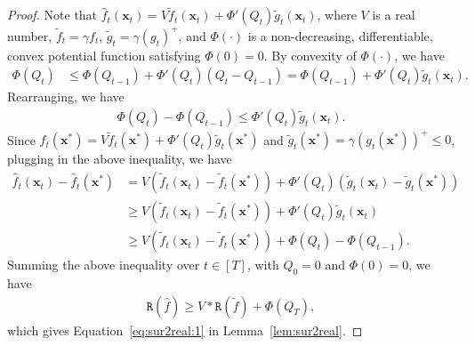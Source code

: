 \documentclass[twoside,11pt,]{article}
\newcommand{\BF}[1]{\mathbf{#1}}
\newcommand{\x}{\BF{x}}
\newcommand{\xt}{\x_t}
\newcommand{\xs}{\x^*}
\newcommand{\tf}{\tilde{f}}
\newcommand{\tft}{\tilde{f}_t}
\newcommand{\tgt}{\tilde{g}_t}
\newcommand{\hf}{\hat{f}}
\newcommand{\hft}{\hat{f}_t}
\newcommand{\qt}{Q_t}
\newcommand{\qtt}{Q_{t-1}}
\begin{document}
\begin{proof}
    Note that $\hft(\xt)=V\tft(\xt)+\Phi'(\qt)\tgt(\x_t)$, where $V$ is a real number, $\tft=\gamma f_t$, $\tgt=\gamma (g_t)^+$, and $\Phi(\cdot)$ is a non-decreasing, differentiable, convex potential function satisfying $\Phi(0)=0$. By convexity of $\Phi(\cdot)$, we have
    \begin{align*}
    \Phi(\qt) 
    &\leq \Phi(\qtt) + \Phi'(\qt)(\qt-\qtt) 
    = \Phi(\qtt) + \Phi'(\qt)\tgt(\xt).
    \end{align*}
    Rearranging, we have
    \begin{align*}
        \Phi(\qt) - \Phi(\qtt) \leq \Phi'(\qt)\tgt(\xt).
    \end{align*}
    Since $\hft(\x^*)=V\tft(\x^*)+\Phi'(\qt)\tgt(\x^*)$ and $\tgt(\x^*)=\gamma (g_t(\x^*))^+ \leq 0$, plugging in the above inequality, we have
    \begin{align*}
        \hft(\xt) - \hft(\xs) &= V\left(\tft(\xt)-\tft(\xs) \right) + \Phi'(\qt)(\tgt(\x_t)-\tgt(\x^*)) \\ 
        & \geq V\left(\tft(\xt) - \tft(\xs) \right) + \Phi'(\qt)\tgt(\x_t) \\
        & \geq V\left(\tft(\xt) - \tft(\xs) \right) + \Phi(\qt) - \Phi(\qtt).
    \end{align*}    
    Summing the above inequality over $t\in[T]$, with $Q_0=0$ and $\Phi(0)=0$, we have 
    \begin{align*}
        \mathtt{R}(\hf) \geq V*\mathtt{R}(\tf) + \Phi(Q_T),
    \end{align*}
    which gives Equation~\eqref{eq:sur2real:1} in Lemma~\ref{lem:sur2real}.
    

\end{proof}
\end{document}
